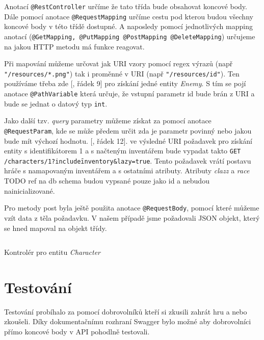 
Anotací \texttt{@RestController} určíme že tato třída bude obsahovat koncové body. Dále pomocí anotace \texttt{@RequestMapping} určíme cestu pod kterou budou všechny koncové body v této třídě dostupné. A naposledy pomocí jednotlivých mapping anotací (\texttt{@GetMapping, @PutMapping @PostMapping @DeleteMapping}) určujeme na jakou HTTP metodu má funkce reagovat. 

Při mapování můžeme určovat jak URI vzory pomocí regex výrazů (např \texttt{"/resources/*.png"}) tak i proměnné v URI (např \texttt{"/resources/{id}"}). Ten používáme třeba zde [, řádek 9] pro získání jedné entity \textit{Enemy}. S tím se pojí anotace \texttt{@PathVariable} která určuje, že vstupní parametr id bude brán z URI a bude se jednat o datový typ \texttt{int}. 

Jako další tzv. \textit{query} parametry můžeme získat za pomocí anotace \texttt{@RequestParam}, kde se může předem určit zda je parametr povinný nebo jakou bude mít výchozí hodnotu. [, řádek 12]. ve výsledné URI požadavek pro získání entity s identifikátorem 1 a s načteným inventářem bude vypadat takto \texttt{GET /characters/1?include\=inventory\&lazy=true}. Tento požadavek vrátí postavu hráče s namapovaným inventářem a s ostatními atributy. Atributy \textit{clazz} a \textit{race} TODO ref na db schema
 budou vypsané pouze jako id a nebudou nainicializované. 

Pro metody post byla ještě použita anotace \texttt{@RequestBody}, pomocí které můžeme vzít data z těla požadavku. V našem případě jsme požadovali JSON objekt, který se hned mapoval na objekt třídy.

\begin{listing}[ht!]
    \inputminted[]{Java}{resources/code/impl/CharacterController.java}
    \caption{Kontrolér pro entitu \textit{Character}}
    \label{code:characterController}
\end{listing}


\section{Testování}\label{sec:testing}
Testování probíhalo za pomocí dobrovolníků kteří si zkusili zahrát hru a nebo zkoušeli. Díky dokumentačnímu rozhraní Swagger 
bylo možné aby dobrovolníci přímo koncové body v API pohodlně testovali.



